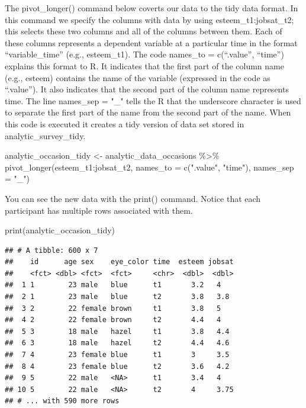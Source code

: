 \documentclass[
]{krantz}
\makeatletter
\newenvironment{Shaded}{\begin{snugshade}}{\end{snugshade}}
\newcommand{\AttributeTok}[1]{\textcolor[rgb]{0.61,0.61,0.61}{#1}}
\newcommand{\FunctionTok}[1]{\textcolor[rgb]{0,0,0}{#1}}
\newcommand{\NormalTok}[1]{#1}
\newcommand{\OtherTok}[1]{\textcolor[rgb]{0.37,0.37,0.37}{#1}}
\newcommand{\SpecialCharTok}[1]{\textcolor[rgb]{0,0,0}{#1}}
\newcommand{\StringTok}[1]{\textcolor[rgb]{0.5,0.5,0.5}{#1}}
\newenvironment{kframe}{%
\medskip{}
\setlength{\fboxsep}{.8em}
 \def\at@end@of@kframe{}%
 \ifinner\ifhmode%
  \def\at@end@of@kframe{\end{minipage}}%
  \begin{minipage}{\columnwidth}%
 \fi\fi%
 \def\FrameCommand##1{\hskip\@totalleftmargin \hskip-\fboxsep
 \colorbox{shadecolor}{##1}\hskip-\fboxsep
     \hskip-\linewidth \hskip-\@totalleftmargin \hskip\columnwidth}%
 \MakeFramed {\advance\hsize-\width
   \@totalleftmargin\z@ \linewidth\hsize
   \@setminipage}}%
 {\par\unskip\endMakeFramed%
 \at@end@of@kframe}
\renewenvironment{Shaded}{\begin{kframe}}{\end{kframe}}
\makeatother
\begin{document}
The pivot\_longer() command below coverts our data to the tidy data format. In this command we specify the columns with data by using esteem\_t1:jobsat\_t2; this selects these two columns and all of the columns between them. Each of these columns represents a dependent variable at a particular time in the format ``variable\_time'' (e.g., esteem\_t1). The code names\_to = c(``.value'', ``time'') explains this format to R. It indicates that the first part of the column name (e.g., esteem) contains the name of the variable (expressed in the code as ``.value''). It also indicates that the second part of the column name represents time. The line names\_sep = "\_" tells the R that the underscore character is used to separate the first part of the name from the second part of the name. When this code is executed it creates a tidy version of data set stored in analytic\_survey\_tidy.

\begin{Shaded}
\begin{Highlighting}[]
\NormalTok{analytic\_occasion\_tidy }\OtherTok{\textless{}{-}}\NormalTok{ analytic\_data\_occasions }\SpecialCharTok{\%\textgreater{}\%}
  \FunctionTok{pivot\_longer}\NormalTok{(esteem\_t1}\SpecialCharTok{:}\NormalTok{jobsat\_t2,}
               \AttributeTok{names\_to =} \FunctionTok{c}\NormalTok{(}\StringTok{".value"}\NormalTok{, }\StringTok{"time"}\NormalTok{),}
               \AttributeTok{names\_sep =} \StringTok{"\_"}\NormalTok{)}
\end{Highlighting}
\end{Shaded}

You can see the new data with the print() command. Notice that each participant has multiple rows associated with them.

\begin{Shaded}
\begin{Highlighting}[]
\FunctionTok{print}\NormalTok{(analytic\_occasion\_tidy)}
\end{Highlighting}
\end{Shaded}

\begin{verbatim}
## # A tibble: 600 x 7
##    id      age sex    eye_color time  esteem jobsat
##    <fct> <dbl> <fct>  <fct>     <chr>  <dbl>  <dbl>
##  1 1        23 male   blue      t1       3.2   4   
##  2 1        23 male   blue      t2       3.8   3.8 
##  3 2        22 female brown     t1       3.8   5   
##  4 2        22 female brown     t2       4.4   4   
##  5 3        18 male   hazel     t1       3.8   4.4 
##  6 3        18 male   hazel     t2       4.4   4.6 
##  7 4        23 female blue      t1       3     3.5 
##  8 4        23 female blue      t2       3.6   4.2 
##  9 5        22 male   <NA>      t1       3.4   4   
## 10 5        22 male   <NA>      t2       4     3.75
## # ... with 590 more rows
\end{verbatim}
\end{document}
